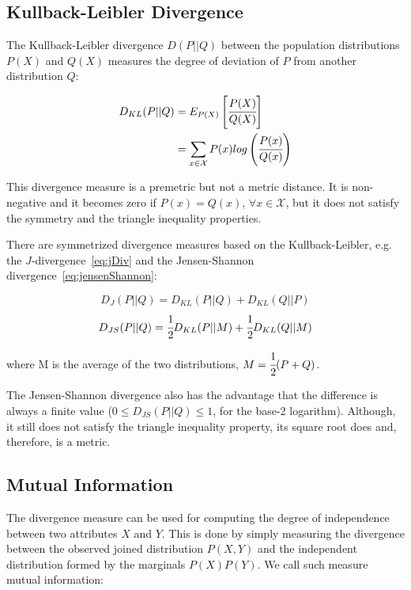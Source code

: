 \subsection{Kullback-Leibler Divergence}

The Kullback-Leibler divergence $D(P||Q)$ between the population distributions $P(X)$ and $Q(X)$ measures the degree
of deviation of $P$ from another distribution $Q$:

\begin{equation}
\begin{split}
 D_{KL}(P||Q)&=E_{P(X)}\left[\cfrac{P(X)}{Q(X)}\right] \\
 &=\sum_{x \in \mathcal{X}}P(x)log\left(\cfrac{P(x)}{Q(x)}\right)
\end{split} 
\end{equation}

This divergence measure is a premetric but not a metric distance. It is non-negative and it becomes zero if
$P(x)=Q(x)$,
$\forall x \in \mathcal{X}$, but it does not satisfy the symmetry and the triangle inequality properties.

There are symmetrized divergence measures based on the Kullback-Leibler, e.g. the $J$-divergence~\ref{eq:jDiv} and the
Jensen-Shannon divergence~\ref{eq:jensenShannon}:

\begin{equation} \label{eq:jDiv}
  D_{J}(P||Q) = D_{KL}(P||Q) + D_{KL}(Q||P)
\end{equation}
\begin{equation} \label{eq:jensenShannon}
  D_{JS}(P||Q) = \cfrac{1}{2}D_{KL}(P||M) + \cfrac{1}{2}D_{KL}(Q||M)
\end{equation}

where M is the average of the two distributions, $M=\cfrac{1}{2}(P+Q)$.

The Jensen-Shannon divergence also has the advantage that the difference is always a finite value ($0 \leq
D_{JS}(P||Q) \leq 1$, for the base-2 logarithm). Although, it still does not satisfy the triangle inequality property,
its square root does and, therefore, is a metric.

\subsection{Mutual Information}

The divergence measure can be used for computing the degree of independence between two attributes $X$ and $Y$. This
is
done by simply measuring the divergence between the observed joined distribution $P(X,Y)$ and the independent
distribution formed by the marginals $P(X)P(Y)$. We call such measure mutual information:

